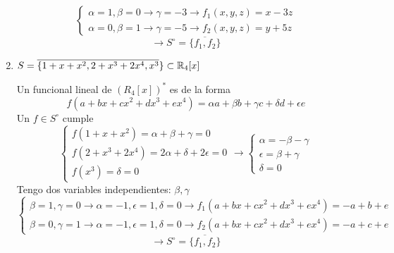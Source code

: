 \begin{enumerate}
\begin{mdframed}[style=s]
                \[\begin{cases}
                    \alpha=1,\beta=0\to\gamma=-3\to f_1(x,y,z)=x-3z\\
                    \alpha=0,\beta=1\to\gamma=-5\to f_2(x,y,z)=y+5z
                \end{cases}\]\[\to S^\circ=\overline{\{f_1,f_2\}}\]
            \end{mdframed}
        \item $S=\overline{\{1+x+x^2,2+x^3+2x^4,x^3}\}\subset \mathbb{R}_4[x]$
            \begin{mdframed}[style=s]
                Un funcional lineal de $(R_4[x])^*$ es de la forma \[f(a+bx+cx^2+dx^3+ex^4)=\alpha a+\beta b+\gamma c+\delta d+\epsilon e\] Un $f\in S^\circ$ cumple
                \[\begin{cases}
                    f(1+x+x^2)=\alpha+\beta+\gamma=0\\
                    f(2+x^3+2x^4)=2\alpha+\delta+2\epsilon=0\\
                    f(x^3)=\delta=0
                \end{cases}\to\begin{cases}
                    \alpha=-\beta-\gamma\\
                    \epsilon=\beta+\gamma\\
                    \delta=0
                \end{cases}\]
                Tengo dos variables independientes: $\beta,\gamma$
                \[\begin{cases}
                    \beta=1,\gamma=0\to\alpha=-1,\epsilon=1,\delta=0\to f_1(a+bx+cx^2+dx^3+ex^4)=-a+b+e\\
                    \beta=0,\gamma=1\to\alpha=-1,\epsilon=1,\delta=0\to f_2(a+bx+cx^2+dx^3+ex^4)=-a+c+e
                \end{cases}\]\[\to S^\circ=\overline{\{f_1,f_2\}}\]
            \end{mdframed}
    \end{enumerate}